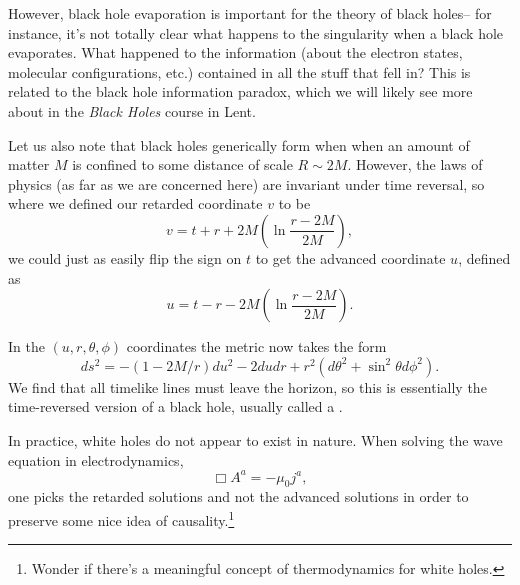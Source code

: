 However, black hole evaporation is important for the theory of black holes-- for instance, it's not totally clear what happens to the singularity when a black hole evaporates. What happened to the information (about the electron states, molecular configurations, etc.) contained in all the stuff that fell in? This is related to the black hole information paradox, which we will likely see more about in the \emph{Black Holes} course in Lent.

Let us also note that black holes generically form when when an amount of matter $M$ is confined to some distance of scale $R\sim 2M$. However, the laws of physics (as far as we are concerned here) are invariant under time reversal, so where we defined our retarded coordinate $v$ to be
$$v=t+r+2M\left(\ln \frac{r-2M}{2M}\right),$$
we could just as easily flip the sign on $t$ to get the advanced coordinate $u$, defined as
$$u=t-r-2M\left(\ln \frac{r-2M}{2M}\right).$$

In the $(u,r,\theta,\phi)$ coordinates the metric now takes the form 
$$ds^2=-(1-2M/r)du^2-2dudr +r^2(d\theta^2 +\sin^2\theta d\phi^2).$$
We find that all timelike lines must leave the horizon, so this is essentially the time-reversed version of a black hole, usually called a .

In practice, white holes do not appear to exist in nature. When solving the wave equation in electrodynamics,
$$\Box A^a=-\mu_0 j^a,$$
one picks the retarded solutions and not the advanced solutions in order to preserve some nice idea of causality.\footnote{Wonder if there's a meaningful concept of thermodynamics for white holes.}

